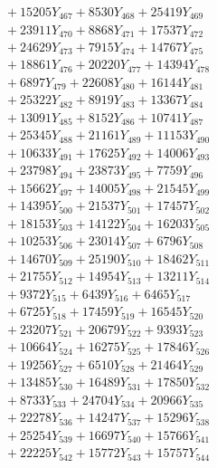 \documentclass[a4paper,10pt]{article}
\begin{document}
{\begin{align}
&\;  + 15205 Y_{467} + 8530 Y_{468} + 25419 Y_{469} \\[0.3ex]
&\;  + 23911 Y_{470} + 8868 Y_{471} + 17537 Y_{472} \\[0.3ex]
&\;  + 24629 Y_{473} + 7915 Y_{474} + 14767 Y_{475} \\[0.3ex]
&\;  + 18861 Y_{476} + 20220 Y_{477} + 14394 Y_{478} \\[0.5ex]\allowbreak
&\;  + 6897 Y_{479} + 22608 Y_{480} + 16144 Y_{481} \\[0.3ex]
&\;  + 25322 Y_{482} + 8919 Y_{483} + 13367 Y_{484} \\[0.3ex]
&\;  + 13091 Y_{485} + 8152 Y_{486} + 10741 Y_{487} \\[0.3ex]
&\;  + 25345 Y_{488} + 21161 Y_{489} + 11153 Y_{490} \\[0.3ex]
&\;  + 10633 Y_{491} + 17625 Y_{492} + 14006 Y_{493} \\[0.3ex]
&\;  + 23798 Y_{494} + 23873 Y_{495} + 7759 Y_{496} \\[0.3ex]
&\;  + 15662 Y_{497} + 14005 Y_{498} + 21545 Y_{499} \\[0.3ex]
&\;  + 14395 Y_{500} + 21537 Y_{501} + 17457 Y_{502} \\[0.3ex]
&\;  + 18153 Y_{503} + 14122 Y_{504} + 16203 Y_{505} \\[0.3ex]
&\;  + 10253 Y_{506} + 23014 Y_{507} + 6796 Y_{508} \\[0.5ex]\allowbreak
&\;  + 14670 Y_{509} + 25190 Y_{510} + 18462 Y_{511} \\[0.3ex]
&\;  + 21755 Y_{512} + 14954 Y_{513} + 13211 Y_{514} \\[0.3ex]
&\;  + 9372 Y_{515} + 6439 Y_{516} + 6465 Y_{517} \\[0.3ex]
&\;  + 6725 Y_{518} + 17459 Y_{519} + 16545 Y_{520} \\[0.3ex]
&\;  + 23207 Y_{521} + 20679 Y_{522} + 9393 Y_{523} \\[0.3ex]
&\;  + 10664 Y_{524} + 16275 Y_{525} + 17846 Y_{526} \\[0.3ex]
&\;  + 19256 Y_{527} + 6510 Y_{528} + 21464 Y_{529} \\[0.3ex]
&\;  + 13485 Y_{530} + 16489 Y_{531} + 17850 Y_{532} \\[0.3ex]
&\;  + 8733 Y_{533} + 24704 Y_{534} + 20966 Y_{535} \\[0.3ex]
&\;  + 22278 Y_{536} + 14247 Y_{537} + 15296 Y_{538} \\[0.5ex]\allowbreak
&\;  + 25254 Y_{539} + 16697 Y_{540} + 15766 Y_{541} \\[0.3ex]
&\;  + 22225 Y_{542} + 15772 Y_{543} + 15757 Y_{544} \\[0.3ex]

\end{align}}
\end{document}
